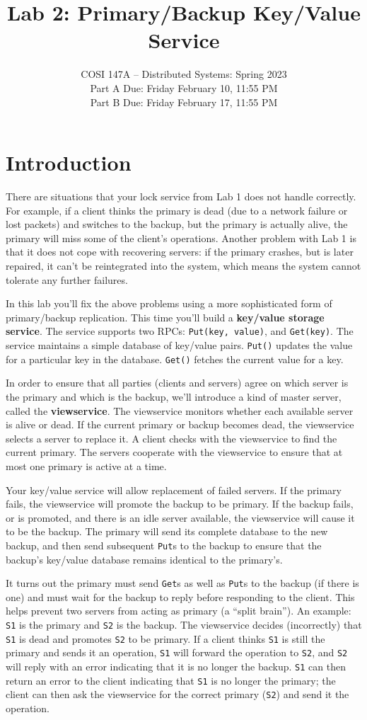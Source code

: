 \documentclass{article}
\title{Lab 2: Primary/Backup Key/Value Service}
\author{COSI 147A -- Distributed Systems: Spring 2023 \\
    Part A Due: Friday February 10, 11:55 PM \\
    Part B Due: Friday February 17, 11:55 PM \\
    }
\date{}
\newcommand{\code}{\texttt}
\begin{document}
\maketitle

\section{Introduction}
There are situations that your lock service from Lab 1 does not handle correctly. For example, if a client thinks the primary is dead (due to a network failure or lost packets) and switches to the backup, but the primary is actually alive, the primary will miss some of the client's operations. Another problem with Lab 1 is that it does not cope with recovering servers: if the primary crashes, but is later repaired, it can't be reintegrated into the system, which means the system cannot tolerate any further failures. 

In this lab you'll fix the above problems using a more sophisticated form of primary/backup replication. This time you'll build a \textbf{key/value storage service}. The service supports two RPCs: \code{Put(key, value)}, and \code{Get(key)}. The service maintains a simple database of key/value pairs. \code{Put()} updates the value for a particular key in the database. \code{Get()} fetches the current value for a key. 

In order to ensure that all parties (clients and servers) agree on which server is the primary and which is the backup, we'll introduce a kind of master server, called the \textbf{viewservice}. The viewservice monitors whether each available server is alive or dead. If the current primary or backup becomes dead, the viewservice selects a server to replace it. A client checks with the viewservice to find the current primary. The servers cooperate with the viewservice to ensure that at most one primary is active at a time. 

Your key/value service will allow replacement of failed servers. If the primary fails, the viewservice will promote the backup to be primary. If the backup fails, or is promoted, and there is an idle server available, the viewservice will cause it to be the backup. The primary will send its complete database to the new backup, and then send subsequent \code{Put}s to the backup to ensure that the backup's key/value database remains identical to the primary's. 

It turns out the primary must send \code{Get}s as well as \code{Put}s to the backup (if there is one) and must wait for the backup to reply before responding to the client. This helps prevent two servers from acting as primary (a ``split brain''). An example: \code{S1} is the primary and \code{S2} is the backup. The viewservice decides (incorrectly) that \code{S1} is dead and promotes \code{S2} to be primary. If a client thinks \code{S1} is still the primary and sends it an operation, \code{S1} will forward the operation to \code{S2}, and \code{S2} will reply with an error indicating that it is no longer the backup. \code{S1} can then return an error to the client indicating that \code{S1} is no longer the primary; the client can then ask the viewservice for the correct primary (\code{S2}) and send it the operation. 
\end{document}
